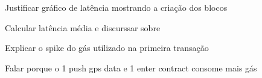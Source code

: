 
Justificar gráfico de latência mostrando a criação dos blocos

Calcular latência média e discurssar sobre

Explicar o spike do gás utilizado na primeira transação

Falar porque o 1 push gps data e 1 enter contract consome mais gás

